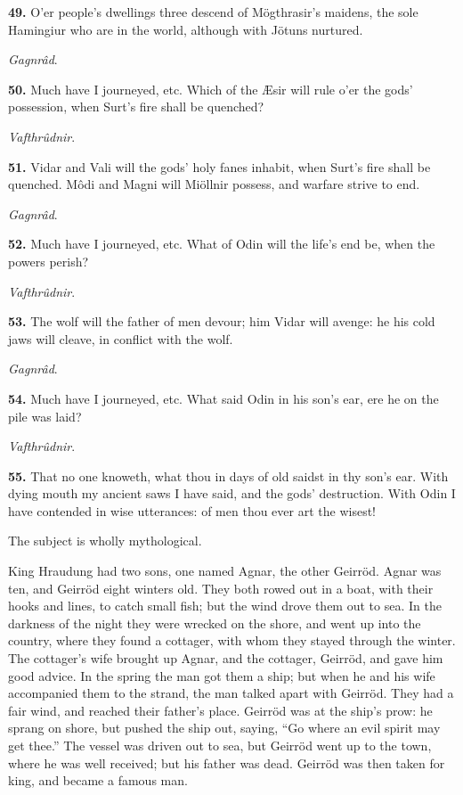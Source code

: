\textbf{49.} O'er people's dwellings three descend of Mögthrasir's maidens,
the sole Hamingiur who are in the world, although with Jötuns
nurtured.

\emph{Gagnrâd}.

\textbf{50.} Much have I journeyed, etc. Which of the Æsir will rule o'er the
gods' possession, when Surt's fire shall be quenched?

\emph{Vafthrûdnir}.

\textbf{51.} Vidar and Vali will the gods' holy fanes inhabit, when Surt's
fire shall be quenched. Môdi and Magni will Miöllnir possess, and
warfare strive to end.

\emph{Gagnrâd}.

\textbf{52.} Much have I journeyed, etc. What of Odin will the life's end be,
when the powers perish?

\emph{Vafthrûdnir}.

\textbf{53.} The wolf will the father of men devour; him Vidar will avenge:
he his cold jaws will cleave, in conflict with the wolf.

\emph{Gagnrâd}.

\textbf{54.} Much have I journeyed, etc. What said Odin in his son's ear, ere
he on the pile was laid?

\emph{Vafthrûdnir}.

\textbf{55.} That no one knoweth, what thou in days of old saidst in thy
son's ear. With dying mouth my ancient saws I have said, and the gods'
destruction. With Odin I have contended in wise utterances: of men
thou ever art the wisest!


The subject is wholly mythological.

King Hraudung had two sons, one named Agnar, the other Geirröd. Agnar
was ten, and Geirröd eight winters old. They both rowed out in a boat,
with their hooks and lines, to catch small fish; but the wind drove
them out to sea. In the darkness of the night they were wrecked on the
shore, and went up into the country, where they found a cottager, with
whom they stayed through the winter. The cottager's wife brought up
Agnar, and the cottager, Geirröd, and gave him good advice. In the
spring the man got them a ship; but when he and his wife accompanied
them to the strand, the man talked apart with Geirröd. They had a fair
wind, and reached their father's place. Geirröd was at the ship's
prow: he sprang on shore, but pushed the ship out, saying, ``Go where
an evil spirit may get thee.'' The vessel was driven out to sea, but
Geirröd went up to the town, where he was well received; but his
father was dead. Geirröd was then taken for king, and became a famous
man.

